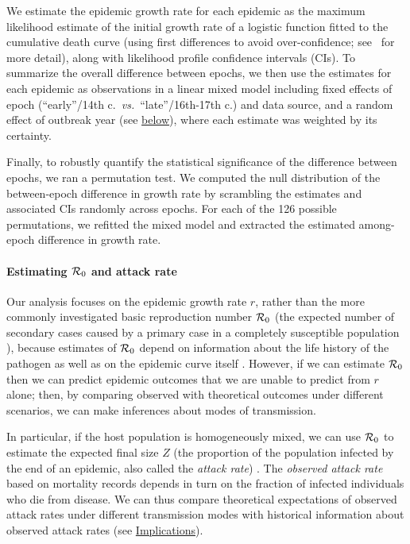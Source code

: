 We estimate the epidemic growth rate for each epidemic as the maximum likelihood estimate of the initial growth rate of a logistic function fitted to the cumulative death curve (using first differences to avoid over-confidence; see \Methodslink\ for more detail), along with likelihood profile confidence intervals (CIs). To summarize the overall difference between epochs, we then use the estimates for each epidemic as observations in a linear mixed model including fixed effects of epoch (``early''/14th c.\ \emph{vs.}\ ``late''/16th-17th c.{}) and data source, and a random effect of outbreak year (see \hyperlink{outbreak.year}{below}), where each estimate was weighted by its certainty.

Finally, to robustly quantify the statistical significance of the difference between epochs, we ran a permutation test. We computed the null distribution of the between-epoch difference in growth rate by scrambling the estimates and associated CIs randomly across epochs. For each of the 126 possible permutations, we refitted the mixed model and extracted the estimated among-epoch difference in growth rate.

\paragraph{Estimating ${\mathcal R}_0$ and attack rate}

Our analysis focuses on the epidemic growth rate $r$, rather than the more commonly investigated basic reproduction number ${\mathcal R}_0$ (the expected number of secondary cases caused by a primary case in a completely susceptible population \cite{AndeMay91}), because estimates of ${\mathcal R}_0$ depend on information about the life history of the pathogen as well as on the epidemic curve itself \cite{WallLips07}. However, if we can estimate ${\mathcal R}_0$ then we can predict epidemic outcomes that we are unable to predict from $r$ alone; then, by comparing observed with theoretical outcomes under different scenarios, we can make inferences about modes of transmission.

In particular, if the host population is homogeneously mixed, we can use ${\mathcal R}_0$ to estimate the expected final size $Z$ (the proportion of the population infected by the end of an epidemic, also called the \emph{attack rate}) \cite{KermMcKe27,MaEarn06}. The \emph{observed attack rate} based on mortality records depends in turn on the fraction of infected individuals who die from disease. We can thus compare theoretical expectations of observed attack rates under different transmission modes with historical information about observed attack rates (see \hyperlink{implications}{Implications}).

